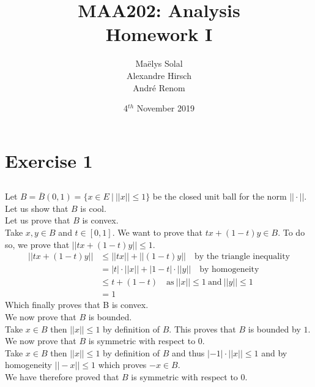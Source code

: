 \documentclass{article}
\title{MAA202: Analysis\\Homework I}
\date{4$^{th}$ November 2019}
\author{Ma\"elys Solal\\Alexandre Hirsch\\Andr\'e Renom}
\begin{document}
	\maketitle

	\tableofcontents
	\newpage
	\renewcommand{\thesubsubsection}{\thesubsection.\alph{subsubsection}}

\section{Exercise 1}
\subsection{} %

Let $B = \overline{B}(0,1) = \{x \in E \ | \ ||x|| \leq 1\}$ be the closed unit ball for the norm $||\cdot||$. Let us show that $B$ is cool. \\

Let us prove that $B$ is convex. \\
Take $x, y \in B$ and $t \in [0, 1]$. We want to prove that $tx + (1-t)y \in B$. To do so, we prove that $||tx + (1-t)y|| \leq 1$. 
\begin{align*}
 	||tx + (1-t)y|| &\leq ||tx|| + ||(1-t)y|| \quad \text{by the triangle inequality} \\
	&= |t|\cdot ||x|| + |1-t|\cdot ||y|| \quad \text{by homogeneity} \\
	&\leq t + (1-t) \quad \text{as} \  ||x|| \leq 1 \  \text{and} \  ||y|| \leq 1 \\
	&= 1 
\end{align*}
Which finally proves that B is convex. \\

We now prove that $B$ is bounded. \\
Take $x \in B$ then $||x|| \leq 1$ by definition of $B$. This proves that $B$ is bounded by $1$. \\

We now prove that $B$ is symmetric with respect to $0$. \\
Take $x \in B$ then $||x|| \leq 1$ by definition of $B$ and thus $|-1|\cdot||x|| \leq 1$ and by homogeneity $||-x|| \leq 1$ which proves $-x \in B$. \\
We have therefore proved that $B$ is symmetric with respect to $0$. \\
\end{document}
